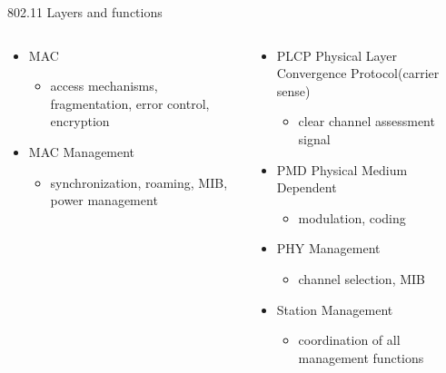 \documentclass[pdf]{beamer}
\begin{document}
\begin{frame}{802.11 Layers and functions}
  \begin{columns}
    \begin{column}{.5\textwidth}
      \begin{itemize}
      \item MAC
        \begin{itemize}
        \item access mechanisms, fragmentation, error control, encryption 
        \end{itemize}
      \item MAC Management         
        \begin{itemize}                                                                                                                         
        \item synchronization, roaming, MIB, power management                       
        \end{itemize} 
      \end{itemize}
    \end{column}
    \begin{column}{.5\textwidth}      
      \begin{itemize}
      \item PLCP Physical Layer Convergence Protocol(carrier sense)
        \begin{itemize}
        \item clear channel assessment signal
        \end{itemize}
      \item PMD Physical Medium Dependent
        \begin{itemize}
        \item modulation, coding
        \end{itemize}
      \item PHY Management
        \begin{itemize}
        \item channel selection, MIB                                      
        \end{itemize}
      \item Station Management
        \begin{itemize}
        \item coordination of all management functions
        \end{itemize}
      \end{itemize}
    \end{column}
  \end{columns}
\end{frame}
\end{document}
